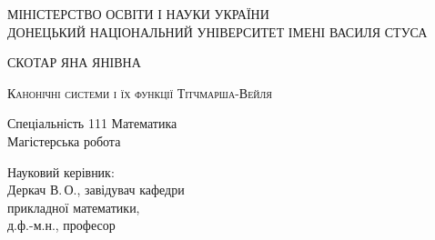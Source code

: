 \begin{titlepage}
\newpage

\begin{center}
МІНІСТЕРСТВО ОСВІТИ І НАУКИ УКРАЇНИ \\
ДОНЕЦЬКИЙ НАЦІОНАЛЬНИЙ УНІВЕРСИТЕТ ІМЕНІ ВАСИЛЯ СТУСА \\
\end{center}

\vspace{3em}

\begin{center}
	\Large СКОТАР ЯНА ЯНІВНА
\end{center}

\vspace{1em}


\vspace{2em}

\begin{center}
	\Large{\textsc{Канонічні системи і їх функції Тітчмарша-Вейля}}\\
	
	\vspace{1em}

	Спеціальність 111 Математика\\
	Магістерська робота
\end{center}

\vspace{4em}

\begin{flushleft}
	Науковий керівник:\\
	Деркач В.\,О., завідувач кафедри\\
	прикладної математики,\\
	д.ф.-м.н., професор
\end{flushleft}


\end{titlepage}
